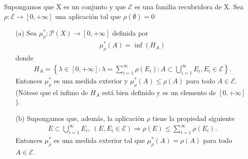 \begin{teo}
Supongamos que X es un conjunto y que $\mathcal{E}$ es una familia recubridora de X. Sea $\rho: \mathcal{E} \longrightarrow [0,+\infty]$ una aplicación tal que $\rho(\emptyset) = 0$
\begin{enumerate}
    \item[(a)] Sea $\mu_{\rho}^*: \mathcal{P}(X) \longrightarrow [0,+\infty]$ definida por
    \begin{align*}
        \mu_{\rho}^*(A) = \inf(H_A)
    \end{align*}
    donde
    \begin{align*}
        H_A = \left\{ \lambda \in [0,+\infty] : \lambda = \sum_{i=1}^{\infty}{\rho(E_i)} : A \subset \bigcup_{i=1}^{\infty}{E_i}, E_i \in \mathcal{E} \right\}.
    \end{align*}
    Entonces $\mu_{\rho}^*$ es una medida exterior y $\mu_{\rho}^*(A) \leq \rho(A)$ para todo $A \in \mathcal{E}$. (Nótese que el ínfimo de $H_A$ está bien definido y es un elemento de $[0,+\infty]$).
    \item[(b)] Supongamos que, además, la aplicación $\rho$ tiene la propiedad siguiente
    \begin{align*}
        E \subset \bigcup_{i=1}^{\infty}{E_i}, \ (E, E_i \in \mathcal{E}) \Longrightarrow \rho(E) \leq \sum_{i=1}^{\infty}{\rho(E_i)}.
    \end{align*}
    Entonces $\mu_{\rho}^*$ es una medida exterior tal que $\mu_{\rho}^*(A) = \rho(A)$ para todo $A \in \mathcal{E}$.
\end{enumerate}
\end{teo}

